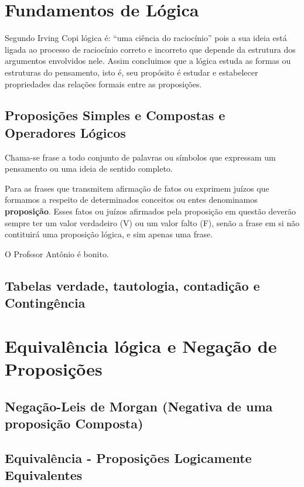 \section{Fundamentos de Lógica}

Segundo Irving Copi lógica é: ``uma ciência do raciocínio'' pois a sua ideia está ligada ao processo de raciocínio correto e incorreto que depende da estrutura dos argumentos envolvidos nele. Assim concluimos que a lógica estuda as formas ou estruturas do pensamento, isto é, seu propósito é estudar e estabelecer propriedades das relações formais entre as proposições.

\subsection{Proposições Simples e Compostas e Operadores Lógicos}

Chama-se frase a todo conjunto de palavras ou símbolos que expressam um pensamento ou uma ideia de sentido completo. 

Para as frases que transmitem afirmação de fatos ou exprimem juízos que formamos a respeito de determinados conceitos ou entes denominamos \textbf{proposição}. Esses fatos ou juízos afirmados pela proposição em questão deverão sempre ter um valor verdadeiro (V) ou um valor falto (F), senão  a frase em si não contituirá uma proposição lógica, e sim apenas uma frase.

\begin{exe}
O Profssor Antônio é bonito.
\end{exe}




\subsection{Tabelas verdade, tautologia, contadição e Contingência}

\section{Equivalência lógica e Negação de Proposições}

\subsection{Negação-Leis de Morgan (Negativa de uma proposição Composta)}
\subsection{Equivalência - Proposições Logicamente Equivalentes}

